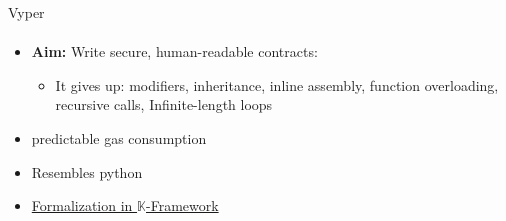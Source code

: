 \begin{frame}{Vyper}
\framesubtitle{\cite{bib:vyper-docs}}

  \begin{itemize}
      \item \textbf{Aim:} Write secure, human-readable  contracts:
      \begin{itemize}
          \item It gives up: modifiers, inheritance, inline assembly, function overloading, recursive calls, Infinite-length loops
      \end{itemize}
    \item predictable gas consumption
    \item Resembles python
      \item \href{https://github.com/kframework/vyper-semantics/}{Formalization in $\mathbb{K}$-Framework}
  \end{itemize}

\end{frame}
